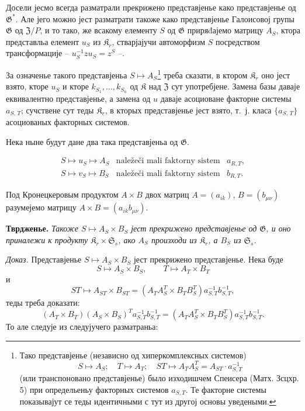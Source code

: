 \documentclass[11pt]{article}
\newcommand{\srcfn}[2]{\footnote{#2}}
\begin{document}
Досели јесмо всегда разматрали прекрижено представјенье како представјенье од \(\mathfrak{G}^*\). Але јего можно јест разматрати такоже како представјенье Галоисовој групы \(\mathfrak{G}\) од \(\mathfrak Z/P\), и то тако, же всакому елементу \(S\) од \(\mathfrak{G}\) приряđајемо матрицу \(A_S\), ктора представльа елемент \(u_S\) из \(\mathfrak K_r\), стварјајучи автоморфизм \(S\) посредством трансформације -- \(u_S^{-1}zu_S=z^S\) --.

За означенье такого представјеньа \(S\mapsto A_S\)\srcfn{1}{Тако представјенье (независно од хиперкомплексных системов)
\[
S\mapsto A_S;\quad T\mapsto A_T;\quad ST\mapsto A_TA_S^T=A_{ST}\cdot a_{S,T}^{-1}
\]
(или транспоновано представјенье) было изходишчем Спеисера (Матх. Зсцхр. 5) при определьеньу факторных системов \(a_{S,T}\). Те факторне системы показывајут се теды идентичными с тут из другој основы уведеными.} треба сказати, в ктором \(\mathfrak K_r\) оно јест взято, кторе \(u_S\) и кторе \(k_{S_1},\ldots,k_{S_n}\) од \(\mathfrak K\) над \(\mathfrak Z\) сут употребјене. Замена базы даваје еквивалентно представјенье, а замена од \(u\) даваје асоциоване факторне системы \(a_{S,\,T}\); сучствене сут теды \(\mathfrak K_r\), в кторых представјенье јест взято, т.~ј. класа \(\{a_{S,\,T}\}\) асоциованых факторных системов.

Нека ныне будут дане два така представјеньа од \(\mathfrak G\).

\[
\begin{array}{lll}
S\mapsto u_S\mapsto A_S & \text{naležeči mali faktorny sistem} & a_{R,T},\\
S\mapsto v_S\mapsto B_S & \text{naležeči mali faktorny sistem} & b_{R,T}.
\end{array}
\]

Под Кронецкеровым продуктом \(A\times B\) двох матриц \(A=(a_{ik})\), \(B=(b_{\mu\nu})\) разумејемо матрицу \(A\times B=(a_{ik}b_{\mu\nu})\).

\noindent\textbf{Тврдженье.} \emph{Такоже \(S\mapsto A_S\times B_S\) јест прекрижено представјенье од \(\mathfrak G\), и оно приналежи к продукту \(\mathfrak K_r\times\mathfrak S_s\), ако \(A_S\) произходи из \(\mathfrak K_r\), а \(B_S\) из \(\mathfrak S_s\).}

\noindent\emph{Доказ.} Представјенье \(S\mapsto A_S\times B_S\) јест прекрижено представјенье. Нека буде
\[
S\mapsto A_S\times B_S,\qquad T\mapsto A_T\times B_T
\]
и
\[
ST\mapsto A_{ST}\times B_{ST}
=(A_TA_S^T\times B_TB_S^T)a_{S,T}^{-1}b_{S,T}^{-1},
\]
теды треба доказати:
\[
(A_T\times B_T)(A_S\times B_S)^T a_{S,T}^{-1}b_{S,T}^{-1}
=(A_TA_S^T\times B_TB_S^T)a_{S,T}^{-1}b_{S,T}^{-1}.
\]
То але следује из следујучего разматраньа:
\end{document}

